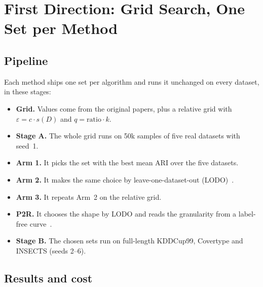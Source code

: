 \section{First Direction: Grid Search, One Set per Method}
\label{sec:first}

\subsection{Pipeline}

Each method ships one set per algorithm and runs it unchanged on every dataset, in these stages:
\begin{itemize}[leftmargin=1.2em,itemsep=0pt,topsep=2pt]
  \item \textbf{Grid.} Values come from the original papers, plus a relative grid with $\varepsilon = c\cdot s(D)$ and $q = \text{ratio}\cdot k$.
  \item \textbf{Stage A.} The whole grid runs on 50k samples of five real datasets with seed~1.
  \item \textbf{Arm 1.} It picks the set with the best mean ARI over the five datasets.
  \item \textbf{Arm 2.} It makes the same choice by leave-one-dataset-out (LODO)~\cite{cerqueira2026drift}.
  \item \textbf{Arm 3.} It repeats Arm~2 on the relative grid.
  \item \textbf{P2R.} It chooses the shape by LODO and reads the granularity from a label-free curve~\cite{fan2020matr}.
  \item \textbf{Stage B.} The chosen sets run on full-length KDDCup99, Covertype and INSECTS (seeds 2--6).
\end{itemize}

\subsection{Results and cost}

